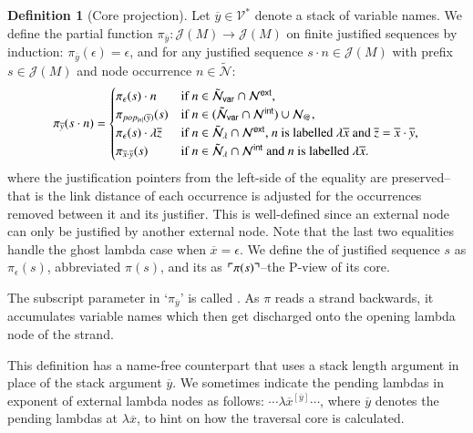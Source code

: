 \documentclass{elsarticle}
\makeatletter
\newif\iflongversion
\theoremstyle{plain}
\theoremstyle{definition}
\newtheorem{definition}{Definition}[section]
\newcommand\VarSet{\mathcal{V}}
\newcommand\Nodes{\mathcal{N}}%
\newcommand\NodesApp{\Nodes_@}%
\newcommand{\ghostlmd}{{\lambda\mkern-7mu \lambda}}
\newcommand\ExtendedNodes{\tilde{\Nodes}}
\newcommand\ExtendedNodesVar{\tilde{\Nodes}_{\sf var}}
\newcommand\ExtendedNodesLmd{\tilde{\Nodes}_{\lambda}}
\def\coresymbol{\pi} %
\newcommand{\core}[1]{\coresymbol(#1)} %
\newcommand{\ExternalNodes}{\Nodes^{\sf ext}}
\newcommand{\InternalNodes}{\Nodes^{\sf int}}
\def\justseqset{\mathcal{J}}
\makeatother
\begin{document}
\begin{definition}[Core projection]
\label{def:coreprojection}
Let $\overline{y} \in \VarSet^*$ denote a stack of variable names.
We define the partial function $\coresymbol_{\overline{y}}\colon \justseqset(M) \longrightarrow \justseqset(M)$ on finite justified sequences by induction: $\coresymbol_{\overline{y}}(\epsilon) = \epsilon$, and for any justified sequence $s \cdot n\in\justseqset(M)$ with prefix $s \in \justseqset(M)$ and node occurrence $n\in\ExtendedNodes$:
\begin{equation*}
\coresymbol_{\overline{y}}(s\cdot n) =
\begin{cases}
    \coresymbol_{\epsilon}(s) \cdot n
    & \mbox{if } n\in\ExtendedNodesVar\inter\ExternalNodes, \\
     \coresymbol_{pop_{|n|}(\overline{y})}(s)
    & \mbox{if } n\in(\ExtendedNodesVar\inter\InternalNodes)\union\NodesApp, \\
    \coresymbol_{\epsilon}(s) \cdot \lambda \overline{z}
    & \mbox{if $n  \in\ExtendedNodesLmd\inter\ExternalNodes$,
     $n$ is labelled $\lambda\overline{x}$ and $\overline{z}=\overline{x}\cdot\overline{y}$,} \\
    \coresymbol_{\overline{x} \cdot \overline{y}}(s)
    & \mbox{if $n \in\ExtendedNodesLmd\inter\InternalNodes$
         and $n$ is labelled $\lambda\overline{x}$.}
\end{cases}
\end{equation*}
where the justification pointers from the left-side of the equality are preserved--that is the link distance of each occurrence is adjusted for the occurrences removed between it and its justifier. This is well-defined since an external node can only be justified by another external node. Note that the last two equalities handle the ghost lambda case when $\overline{x}=\epsilon$.
We define the  of justified sequence $s$ as $\coresymbol_\epsilon(s)$,
abbreviated $\core{s}$, and its  as $\pview{\core{s}}$--the P-view of its core.
\end{definition}

The subscript parameter in `$\coresymbol_{\overline{y}}$' is called . As $\coresymbol$ reads a strand backwards, it accumulates variable names which then get discharged onto the opening lambda node of the strand.
\iflongversion
So in words, the \emph{core projection} is the sub-sequence obtained by removing all internal nodes and discharging on each external lambda node the stack of \emph{pending lambdas} at that point.
\fi
This definition has a name-free counterpart that uses a stack length argument in place of the stack argument $\overline{y}$.
%
We sometimes indicate the pending lambdas in exponent of external lambda nodes as follows:
$\cdots  \lambda\overline{x}^{[\overline{y}]} \cdots$, where $\overline{y}$ denotes the pending lambdas at $\lambda\overline{x}$, to hint on how the traversal core is calculated.
\end{document}
